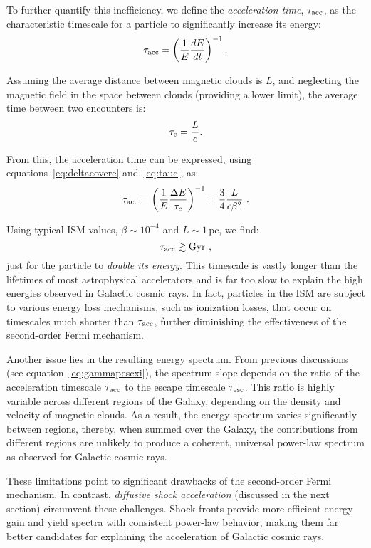 To further quantify this inefficiency, we define the \emph{acceleration time}, \( \tau_{\rm acc} \), as the characteristic timescale for a particle to significantly increase its energy:
\begin{equation}
\tau_{\rm acc} = \left( \frac{1}{E} \frac{dE}{dt} \right)^{-1}.
\end{equation}

Assuming the average distance between magnetic clouds is \( L \), and neglecting the magnetic field in the space between clouds (providing a lower limit), the average time between two encounters is:
\begin{equation}\label{eq:tauc}
\tau_{\rm c} = \frac{L}{c}.
\end{equation}

From this, the acceleration time can be expressed, using equations~\eqref{eq:deltaeovere} and~\eqref{eq:tauc}, as:
\begin{equation}
\tau_{\rm acc} = \left( \frac{1}{E} \frac{\Delta E}{\tau_c} \right)^{-1} = \frac{3}{4} \frac{L}{c \beta^2}~.
\end{equation}

Using typical ISM values, \( \beta \sim 10^{-4} \) and \( L \sim 1 \, \text{pc} \), we find:
\[
\tau_{\rm acc} \gtrsim \text{Gyr}~,
\]
just for the particle to \emph{double its energy}. This timescale is vastly longer than the lifetimes of most astrophysical accelerators and is far too slow to explain the high energies observed in Galactic cosmic rays. In fact, particles in the ISM are subject to various energy loss mechanisms, such as ionization losses, that occur on timescales much shorter than \( \tau_{\rm acc} \), further diminishing the effectiveness of the second-order Fermi mechanism.

Another issue lies in the resulting energy spectrum. From previous discussions (see equation~\ref{eq:gammapescxi}), the spectrum slope depends on the ratio of the acceleration timescale \( \tau_{\rm acc} \) to the escape timescale \( \tau_{\rm esc} \). This ratio is highly variable across different regions of the Galaxy, depending on the density and velocity of magnetic clouds. As a result, the energy spectrum varies significantly between regions, thereby, when summed over the Galaxy, the contributions from different regions are unlikely to produce a coherent, universal power-law spectrum as observed for Galactic cosmic rays.

These limitations point to significant drawbacks of the second-order Fermi mechanism.
%
In contrast, \emph{diffusive shock acceleration} (discussed in the next section) circumvent these challenges. Shock fronts provide more efficient energy gain and yield spectra with consistent power-law behavior, making them far better candidates for explaining the acceleration of Galactic cosmic rays.

